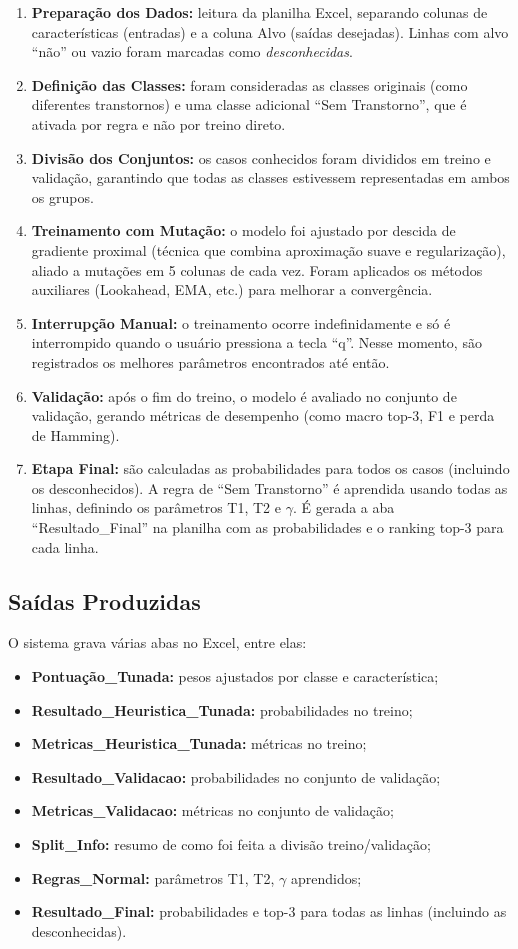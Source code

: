 \documentclass[12pt,a4paper]{article}
\begin{document}
\begin{enumerate}
    \item \textbf{Preparação dos Dados:} leitura da planilha Excel, separando colunas de características (entradas) e a coluna Alvo (saídas desejadas).
    Linhas com alvo ``não'' ou vazio foram marcadas como \emph{desconhecidas}.
    \item \textbf{Definição das Classes:} foram consideradas as classes originais (como diferentes transtornos) e uma classe adicional ``Sem Transtorno'', que é ativada por regra e não por treino direto.
    \item \textbf{Divisão dos Conjuntos:} os casos conhecidos foram divididos em treino e validação, garantindo que todas as classes estivessem representadas em ambos os grupos.
    \item \textbf{Treinamento com Mutação:} o modelo foi ajustado por descida de gradiente proximal (técnica que combina aproximação suave e regularização), aliado a mutações em 5 colunas de cada vez. Foram aplicados os métodos auxiliares (Lookahead, EMA, etc.) para melhorar a convergência.
    \item \textbf{Interrupção Manual:} o treinamento ocorre indefinidamente e só é interrompido quando o usuário pressiona a tecla ``q''. Nesse momento, são registrados os melhores parâmetros encontrados até então.
    \item \textbf{Validação:} após o fim do treino, o modelo é avaliado no conjunto de validação, gerando métricas de desempenho (como macro top-3, F1 e perda de Hamming).
    \item \textbf{Etapa Final:} são calculadas as probabilidades para todos os casos (incluindo os desconhecidos). A regra de ``Sem Transtorno'' é aprendida usando todas as linhas, definindo os parâmetros T1, T2 e $\gamma$. É gerada a aba ``Resultado\_Final'' na planilha com as probabilidades e o ranking top-3 para cada linha.
\end{enumerate}

\subsection*{Saídas Produzidas}
O sistema grava várias abas no Excel, entre elas:
\begin{itemize}
    \item \textbf{Pontuação\_Tunada:} pesos ajustados por classe e característica;
    \item \textbf{Resultado\_Heuristica\_Tunada:} probabilidades no treino;
    \item \textbf{Metricas\_Heuristica\_Tunada:} métricas no treino;
    \item \textbf{Resultado\_Validacao:} probabilidades no conjunto de validação;
    \item \textbf{Metricas\_Validacao:} métricas no conjunto de validação;
    \item \textbf{Split\_Info:} resumo de como foi feita a divisão treino/validação;
    \item \textbf{Regras\_Normal:} parâmetros T1, T2, $\gamma$ aprendidos;
    \item \textbf{Resultado\_Final:} probabilidades e top-3 para todas as linhas (incluindo as desconhecidas).
\end{itemize}
\end{document}
